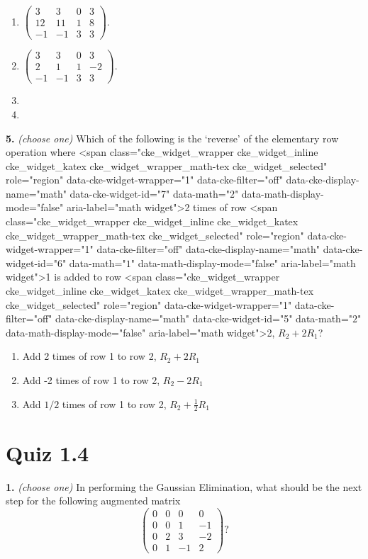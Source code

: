 \documentclass[10pt,a4paper]{article}
\begin{document}
\begin{enumerate}[label=(\Alph*)]
\item \(\left(\begin{array}{ccc|c}      3  &   3  &   0  &   3\\     12  &  11  &   1  &   8\\     -1  &  -1  &   3  &   3 \end{array}\right).\)
\item \(\left(\begin{array}{ccc|c}      3  &   3  &   0  &   3\\      2  &   1  &   1  &  -2\\     -1  &  -1  &   3  &   3 \end{array}\right).\)
\item 
\item 
\end{enumerate}
\smallskip
\textbf{5.} \textit{(choose one)} Which of the following is the ‘reverse’ of the elementary row operation where <span class="cke\_widget\_wrapper cke\_widget\_inline cke\_widget\_katex cke\_widget\_wrapper\_math-tex cke\_widget\_selected" role="region" data-cke-widget-wrapper="1" data-cke-filter="off" data-cke-display-name="math" data-cke-widget-id="7" data-math="\(2\)" data-math-display-mode="false" aria-label="math widget">2 times of row <span class="cke\_widget\_wrapper cke\_widget\_inline cke\_widget\_katex cke\_widget\_wrapper\_math-tex cke\_widget\_selected" role="region" data-cke-widget-wrapper="1" data-cke-filter="off" data-cke-display-name="math" data-cke-widget-id="6" data-math="\(1\)" data-math-display-mode="false" aria-label="math widget">1 is added to row <span class="cke\_widget\_wrapper cke\_widget\_inline cke\_widget\_katex cke\_widget\_wrapper\_math-tex cke\_widget\_selected" role="region" data-cke-widget-wrapper="1" data-cke-filter="off" data-cke-display-name="math" data-cke-widget-id="5" data-math="\(2\)" data-math-display-mode="false" aria-label="math widget">2, \(R_2+2R_1\)?

\begin{enumerate}[label=(\Alph*)]
\item Add 2 times of row 1 to row 2, \(R_2+2R_1\)
\item Add -2 times of row 1 to row 2, \(R_2-2R_1\)
\item Add \(1/2\) times of row 1 to row 2, \(R_2+\frac{1}{2}R_1\)
\end{enumerate}
\smallskip
\section{Quiz 1.4}
\textbf{1.} \textit{(choose one)} In performing the Gaussian Elimination, what should be the next step for the following augmented matrix \[\left(\begin{array}{ccc|c}      0&0&0&0\\      0&0&1&-1\\      0&2&3&-2\\      0&1&-1&2 \end{array}\right)?\]
\end{document}
